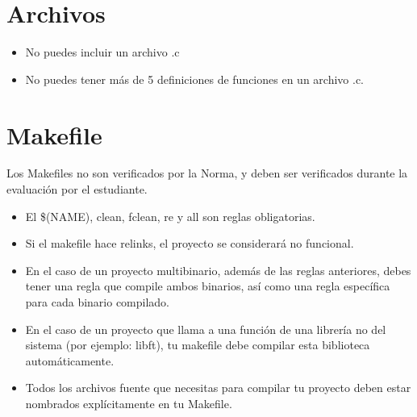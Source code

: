 \documentclass{42-es}
\begin{document}
\newpage

\section{Archivos}

\begin{itemize}
      \item No puedes incluir un archivo .c
      \item No puedes tener más de 5 definiciones de funciones en un archivo
            .c.
\end{itemize}
\newpage

\section{Makefile}
Los Makefiles no son verificados por la Norma, y deben ser verificados durante
la evaluación por el estudiante.

\begin{itemize}

      \item El \$(NAME), clean, fclean, re y all son reglas obligatorias.
      \item Si el makefile hace relinks, el proyecto se considerará no funcional.
      \item En el caso de un proyecto multibinario, además de las reglas
            anteriores, debes tener una regla que compile ambos binarios, así
            como una regla específica para cada binario compilado.
      \item En el caso de un proyecto que llama a una función de una librería no del sistema (por ejemplo: libft), tu makefile debe compilar esta biblioteca automáticamente.
      \item Todos los archivos fuente que necesitas para compilar tu proyecto deben estar nombrados explícitamente en tu Makefile.
\end{itemize}
\end{document}
